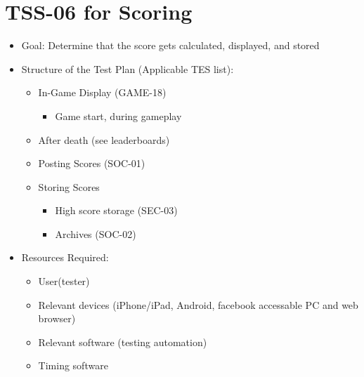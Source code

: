 \section{TSS-06 for Scoring}
\begin{itemize}
\item Goal: Determine that the score gets calculated, displayed, and stored

\item Structure of the Test Plan (Applicable TES list):
\begin{itemize}
\item In-Game Display (GAME-18)
\begin{itemize}
\item Game start, during gameplay
\end{itemize}

\item After death (see leaderboards)
\item Posting Scores (SOC-01)

\item Storing Scores
\begin{itemize}
\item High score storage (SEC-03)
\item Archives (SOC-02)
\end{itemize}
\end{itemize}

\item Resources Required:
\begin{itemize}
\item User(tester)
\item Relevant devices (iPhone/iPad, Android, facebook accessable PC and web browser)
\item Relevant software (testing automation)
\item Timing software
\end{itemize}
\end{itemize}


